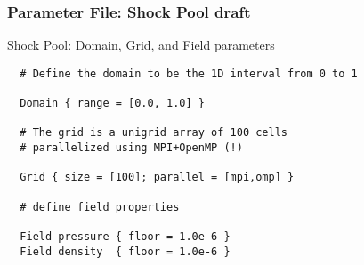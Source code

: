     \begin{frame}[fragile] \frametitle{Parameter File: Shock Pool draft}
 \footnotesize
\begin{block}{Shock Pool: Domain, Grid, and Field parameters}
      \begin{verbatim}
  # Define the domain to be the 1D interval from 0 to 1

  Domain { range = [0.0, 1.0] }

  # The grid is a unigrid array of 100 cells 
  # parallelized using MPI+OpenMP (!)
 
  Grid { size = [100]; parallel = [mpi,omp] }

  # define field properties

  Field pressure { floor = 1.0e-6 }
  Field density  { floor = 1.0e-6 }
      \end{verbatim}
\end{block}
\end{frame}
